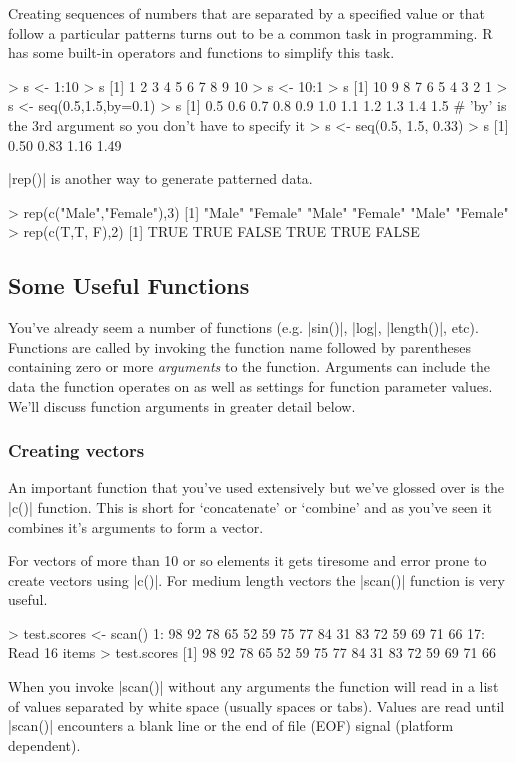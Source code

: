 Creating sequences of numbers that are separated by a specified value or
that follow a particular patterns turns out to be a common task in
programming. R has some built-in operators and functions to simplify
this task.
%
\begin{R}
> s <- 1:10
> s
 [1]  1  2  3  4  5  6  7  8  9 10
> s <- 10:1
> s
 [1] 10  9  8  7  6  5  4  3  2  1
> s <- seq(0.5,1.5,by=0.1)
> s
 [1] 0.5 0.6 0.7 0.8 0.9 1.0 1.1 1.2 1.3 1.4 1.5
# 'by' is the 3rd argument so you don't have to specify it
> s <- seq(0.5, 1.5, 0.33)
> s
[1] 0.50 0.83 1.16 1.49
\end{R}

|rep()| is another way to generate patterned data.
%
\begin{R}
> rep(c("Male","Female"),3)
[1] "Male"   "Female" "Male"   "Female" "Male"   "Female"
> rep(c(T,T, F),2)
[1]  TRUE  TRUE FALSE  TRUE  TRUE FALSE
\end{R}


\subsection{Some Useful Functions}

You've already seem a number of functions (e.g. |sin()|,
|log|, |length()|, etc). Functions are called by
invoking the function name followed by parentheses containing zero or
more \emph{arguments} to the function. Arguments can include the data
the function operates on as well as settings for function parameter
values. We'll discuss function arguments in greater detail below.

\subsubsection{Creating vectors}

An important function that you've used extensively but we've glossed
over is the |c()| function. This is short for `concatenate' or
`combine' and as you've seen it combines it's arguments to form a
vector.

For vectors of more than 10 or so elements it gets tiresome and error
prone to create vectors using |c()|. For medium length vectors
the |scan()| function is very useful.
%
\begin{R}
> test.scores <- scan()
1: 98 92 78 65 52 59 75 77 84 31 83 72 59 69 71 66
17:
Read 16 items
> test.scores
 [1] 98 92 78 65 52 59 75 77 84 31 83 72 59 69 71 66
\end{R}
%
When you invoke |scan()| without any arguments the function
will read in a list of values separated by white space (usually spaces
or tabs). Values are read until |scan()| encounters a blank
line or the end of file (EOF) signal (platform dependent).

